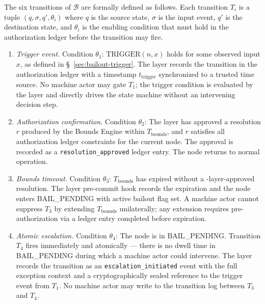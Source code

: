 The six transitions of $\mathcal{B}$ are formally defined as follows. Each transition $T_i$ is a tuple $(q, \sigma, q', \theta_i)$ where $q$ is the source state, $\sigma$ is the input event, $q'$ is the destination state, and $\theta_i$ is the enabling condition that must hold in the authorization ledger before the transition may fire.

\begin{enumerate}\itemsep=0pt
\item[$T_1$ (IDLE $\rightarrow$ BOUNDED).] \emph{Trigger event.} Condition $\theta_1$: $\text{TRIGGER}(n, x)$ holds for some observed input $x$, as defined in \S~\ref{sec:bailout-trigger}. The \fact{} layer records the transition in the authorization ledger with a timestamp $t_{\text{trigger}}$ synchronized to a trusted time source. No machine actor may gate $T_1$; the trigger condition is evaluated by the \bounds{} layer and directly drives the state machine without an intervening decision step.

\item[$T_2$ (BOUNDED $\rightarrow$ HUMAN\_ACKNOWLEDGED).] \emph{Authorization confirmation.} Condition $\theta_2$: The \fact{} layer has approved a resolution $r$ produced by the Bounds Engine within $T_{\text{bounds}}$, and $r$ satisfies all authorization ledger constraints for the current node. The approval is recorded as a \texttt{resolution\_approved} ledger entry. The node returns to normal operation.

\item[$T_3$ (BOUNDED $\rightarrow$ BAIL\_PENDING).] \emph{Bounds timeout.} Condition $\theta_3$: $T_{\text{bounds}}$ has expired without a \fact-layer-approved resolution. The \fact{} layer pre-commit hook records the expiration and the node enters BAIL\_PENDING with active bailout flag set. A machine actor cannot suppress $T_3$ by extending $T_{\text{bounds}}$ unilaterally; any extension requires pre-authorization via a ledger entry completed before expiration.

\item[$T_4$ (BAIL\_PENDING $\rightarrow$ ESCALATING).] \emph{Atomic escalation.} Condition $\theta_4$: The node is in BAIL\_PENDING. Transition $T_4$ fires immediately and atomically — there is no dwell time in BAIL\_PENDING during which a machine actor could intervene. The \fact{} layer records the transition as an \texttt{escalation\_initiated} event with the full exception context and a cryptographically sealed reference to the trigger event from $T_1$. No machine actor may write to the transition log between $T_3$ and $T_4$.


\end{enumerate}
